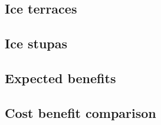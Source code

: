 \subsection{Ice terraces}

\subsection{Ice stupas}

\subsection{Expected benefits}

\subsection{Cost benefit comparison}







